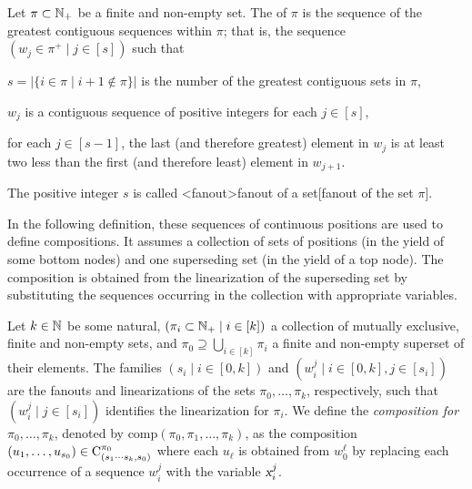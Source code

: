 \documentclass[../../document.tex]{subfiles}
\begin{document}
    \begin{definition}[Linearization]
        Let \(\pi \subset \mathbb{N}_+\) be a finite and non-empty set.
        The  of \(\pi\) is the sequence of the greatest contiguous sequences within \(\pi\); that is, the sequence \((w_j \in \pi^+ \mid j \in [s])\) such that
        \begin{compactitem}
            \item \(s = |\{i \in \pi \mid i+1 \notin \pi\}|\) is the number of the greatest contiguous sets in \(\pi\),
            \item \(w_j\) is a contiguous sequence of positive integers for each \(j \in [s]\),
            \item for each \(j \in [s-1]\), the last (and therefore greatest) element in \(w_j\) is at least two less than the first (and therefore least) element in \(w_{j+1}\).
        \end{compactitem}
        The positive integer \(s\) is called <fanout>{fanout of a set}[fanout of the set \(\pi\)].
    \end{definition}

    In the following definition, these sequences of continuous positions are used to define  compositions.
    It assumes a collection of sets of positions (in the yield of some bottom nodes) and one superseding set (in the yield of a top node).
    The composition is obtained from the linearization of the superseding set by substituting the sequences occurring in the collection with appropriate variables.

    \begin{definition}
        Let \(k \in \mathbb{N}\) be some natural, \((\pi_i \subset \mathbb{N}_+ \mid i \in [k])\) a collection of mutually exclusive, finite and non-empty sets, and \(\pi_0 \supseteq \bigcup_{i \in [k]} \pi_i\) a finite and non-empty superset of their elements.
        The families \((s_i \mid i \in [0,k])\) and \((w_i^j \mid i \in [0,k], j \in [s_i])\) are the fanouts and linearizations of the sets \(\pi_0, \ldots, \pi_k\), respectively, such that \((w_i^j \mid j \in [s_i])\) identifies the linearization for \(\pi_i\).
        We define the \emph{ composition for \(\pi_0, \ldots, \pi_k\)}, denoted by \(\mathrm{comp}(\pi_0, \pi_1, \ldots, \pi_k)\), as the composition \((u_1, \ldots, u_{s_0}) \in \mathrm{C}^{\pi_0}_{(s_1\cdots s_k, s_0)}\) where each \(u_\ell\) is obtained from \(w_0^\ell\) by replacing each occurrence of a sequence \(w_i^j\) with the variable \(\textsl{x}_i^j\).
    \end{definition}
\end{document}
